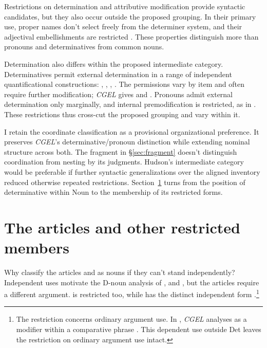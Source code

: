 \documentclass[12pt]{article}
\begin{document}
Restrictions on determination and attributive modification provide syntactic candidates, but they also occur outside the proposed grouping. In their primary use, proper names don't select freely from the determiner system, and their adjectival embellishments are restricted \citep[517, 519--520]{huddleston2002}. These properties distinguish more than pronouns and determinatives from common nouns.

Determination also differs within the proposed intermediate category. Determinatives permit external determination in a range of independent quantificational constructions: , , , . The permissions vary by item and often require further modification; \textit{CGEL} gives  and  \citep[415--416]{huddleston2002}. Pronouns admit external determination only marginally, and internal premodification is restricted, as in  \citep[429--430]{huddleston2002}. These restrictions thus cross-cut the proposed grouping and vary within it.

I retain the coordinate classification as a provisional organizational preference. It preserves \textit{CGEL}'s determinative/pronoun distinction while extending nominal structure across both. The fragment in §\ref{sec:fragment} doesn't distinguish coordination from nesting by its judgments. Hudson's intermediate category would be preferable if further syntactic generalizations over the aligned inventory reduced otherwise repeated restrictions. Section~\ref{sec:articles} turns from the position of determinative within Noun to the membership of its restricted forms.

\section{The articles and other restricted members}\label{sec:articles}

Why classify the articles  and  as nouns if they can't stand independently? Independent uses motivate the D-noun analysis of ,  and , but the articles require a different argument.  is restricted too, while  has the distinct independent form  \citep[371--372, 410--411]{huddleston2002}.\footnote{The restriction concerns ordinary argument use. In , \textit{CGEL} analyses  as a modifier within a comparative phrase \citep[1131--1132, 1135--1136]{huddleston2002}. This dependent use outside Det leaves the restriction on ordinary argument use intact.}
\end{document}
